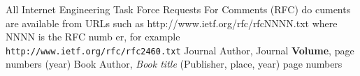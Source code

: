 \documentclass{webofc}
\begin{document}
%
%
%
%
% 
%
%
\begin{thebibliography}{}
%
%
 All Internet Engineering Task Force Requests For Comments (RFC) do
cuments are available
from URLs such as http://www.ietf.org/rfc/rfcNNNN.txt where NNNN is the RFC numb
er, for example {\tt http://www.ietf.org/rfc/rfc2460.txt}
Journal Author, Journal \textbf{Volume}, page numbers (year)
Book Author, \textit{Book title} (Publisher, place, year) page numbers
\end{thebibliography}
\end{document}
